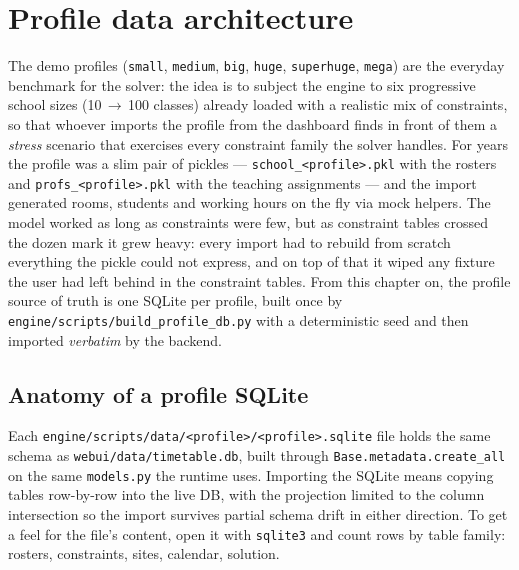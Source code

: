 \chapter{Profile data architecture}
\label{ch:architettura_dati_profili}

The demo profiles (\texttt{small}, \texttt{medium}, \texttt{big},
\texttt{huge}, \texttt{superhuge}, \texttt{mega}) are the everyday
benchmark for the solver: the idea is to subject the engine to six
progressive school sizes (10\,$\to$\,100 classes) already loaded
with a realistic mix of constraints, so that whoever imports the
profile from the dashboard finds in front of them a \emph{stress}
scenario that exercises every constraint family the solver
handles. For years the profile was a slim pair of pickles ---
\texttt{school\_<profile>.pkl} with the rosters and
\texttt{profs\_<profile>.pkl} with the teaching assignments ---
and the import generated rooms, students and working hours on the
fly via mock helpers. The model worked as long as constraints were
few, but as constraint tables crossed the dozen mark it grew
heavy: every import had to rebuild from scratch everything the
pickle could not express, and on top of that it wiped any fixture
the user had left behind in the constraint tables. From this
chapter on, the profile source of truth is one SQLite per
profile, built once by \texttt{engine/scripts/build\_profile\_db.py}
with a deterministic seed and then imported \emph{verbatim} by the
backend.

\section{Anatomy of a profile SQLite}

Each \texttt{engine/scripts/data/<profile>/<profile>.sqlite} file
holds the same schema as \texttt{webui/data/timetable.db}, built
through \texttt{Base.metadata.create\_all} on the same
\texttt{models.py} the runtime uses. Importing the SQLite means
copying tables row-by-row into the live DB, with the projection
limited to the column intersection so the import survives partial
schema drift in either direction. To get a feel for the file's
content, open it with \texttt{sqlite3} and count rows by table
family: rosters, constraints, sites, calendar, solution.

